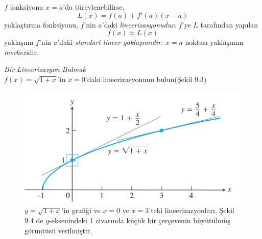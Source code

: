 \begin{tanim}
	$f$ fonksiyonu $x=a$'da türevlenebilirse,
	\begin{equation*}
	L(x)=f(a)+f'(a)(x-a)
	\end{equation*}
yaklaştırma fonksiyonu, $f$'nin $a$'daki \textit{lineerizasyonudur}. $f$'ye $L$ tarafından yapılan
	\begin{equation*}
	f(x) \approx L(x)
	\end{equation*}
yaklaşımı $f$'nin $a$'daki \textit{standart lineer yaklaşımıdır}.  $x=a$ noktası yaklaşımın \textit{merkezi}dir.
\end{tanim}
\begin{ornek}\textit{Bir Lineerizasyon Bulmak}\\
$f(x)=\sqrt{1+x}$'in $x=0$'daki lineerizasyonunu bulun(Şekil 9.3)
\begin{figure}[H]
	\centering
	\includegraphics[width=0.5\linewidth]{lineerizasyon3.png}
	\caption{$y=\sqrt{1+x}$'in grafiği ve $x=0$ ve $x=3$'teki lineerizasyonları. Şekil 9.4 de $y$-eksenindeki 1 civarında küçük bir çerçevenin büyütülmüş görüntüsü verilmiştir.}
	\label{fig:ornekresim}
\end{figure}
\end{ornek}
